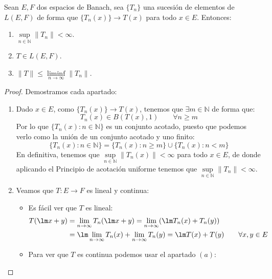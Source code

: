 \begin{coro}
    Sean $E,F$ dos espacios de Banach, sea $\{T_n\}$ una sucesión de elementos de $L(E,F)$ de forma que $\{T_n(x)\} \to T(x)$ para todo $x\in E$. Entonces:
    \begin{enumerate}[label=(\alph*)]
        \item $\sup\limits_{n\in \mathbb{N}}\|T_n\| < \infty$.
        \item $T\in L(E,F)$.
        \item $\|T\| \leq \liminf\limits_{n\to\infty}\|T_n\|$.
    \end{enumerate}
    \begin{proof}
        Demostramos cada apartado:
        \begin{enumerate}[label=(\alph*)]
            \item Dado $x\in E$, como $\{T_n(x)\}\to T(x)$, tenemos que $\exists m\in \mathbb{N}$ de forma que:
                \begin{equation*}
                    T_n(x) \in B(T(x), 1) \qquad \forall n\geq m
                \end{equation*}
                Por lo que $\{T_n(x) : n\in \mathbb{N}\}$ es un conjunto acotado, puesto que podemos verlo como la unión de un conjunto acotado y uno finito:
                \begin{equation*}
                    \{T_n(x) : n\in \mathbb{N}\} = \{T_n(x) : n\geq m\} \cup \{T_n(x) : n < m\} 
                \end{equation*}
                En definitiva, tenemos que $\sup\limits_{n\in \mathbb{N}}\|T_n(x)\| < \infty$ para todo $x\in E$, de donde aplicando el Principio de acotación uniforme tenemos que $\sup\limits_{n\in \mathbb{N}}\|T_n\| < \infty$.
            \item Veamos que $T:E\to F$ es lineal y continua:
                \begin{itemize}
                    \item Es fácil ver que $T$ es lineal:
                        \begin{align*}
                            T(\lm x + y) &= \lim_{n\to\infty}T_n(\lm x + y) = \lim_{n\to\infty}(\lm T_n(x) + T_n(y)) \\ 
                                         &= \lm \lim_{n\to\infty}T_n(x) + \lim_{n\to\infty}T_n(y) = \lm T(x) + T(y) \qquad \forall x,y\in E
                        \end{align*}
                    \item Para ver que $T$ es continua podemos usar el apartado $(a)$:

\end{itemize}
\end{enumerate}
\end{proof}
\end{coro}
